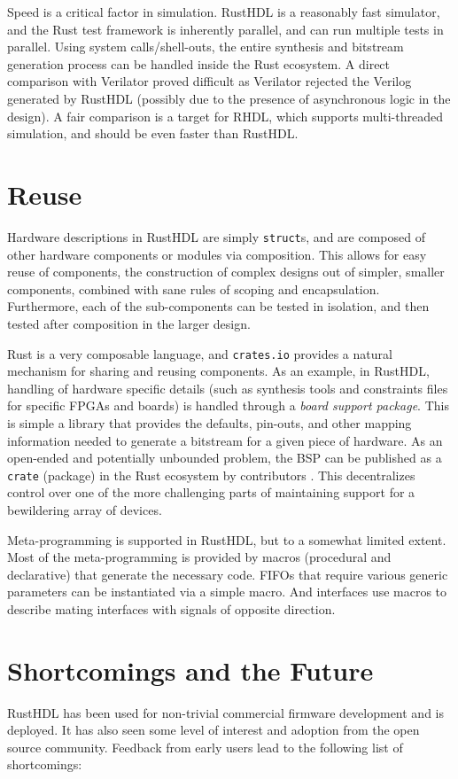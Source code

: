 \documentclass[sigplan,screen,sigconf]{acmart}
\begin{document}
Speed is a critical factor in simulation.  RustHDL is a reasonably fast simulator, 
and the Rust test framework is inherently parallel, and can run multiple tests in parallel. Using system calls/shell-outs, the entire synthesis and bitstream generation process can be handled inside the Rust ecosystem.  A direct comparison with Verilator proved difficult as Verilator rejected the Verilog generated by RustHDL (possibly due to the presence of asynchronous logic in the design).  A fair comparison is a target for RHDL, which supports multi-threaded simulation, and should be even faster than RustHDL.

\section{Reuse}
Hardware descriptions in RustHDL are simply \verb|struct|s, and are composed of other 
hardware components or modules via composition.  This allows for easy reuse of components, the
construction of complex designs out of simpler, smaller components, combined with sane rules of scoping and encapsulation.  Furthermore, each of the sub-components can be tested in isolation, and then tested after composition in the larger design. 

Rust is a very composable language, and \verb|crates.io| provides a natural mechanism
for sharing and reusing components.  As an example, in RustHDL, handling of hardware specific details (such as synthesis tools and constraints files for specific FPGAs and boards) is handled through a \emph{board support package}.  This is simple a library that provides the defaults, pin-outs, and other mapping information needed to generate a bitstream for a given piece of hardware.  As an open-ended and potentially unbounded problem, the BSP can be published as a \verb|crate| (package) in the Rust ecosystem by contributors \cite{b7}.  This decentralizes control over one of the more challenging parts of maintaining support for a bewildering array of devices. 

Meta-programming is supported in RustHDL, but to a somewhat limited extent.  Most of the meta-programming is provided by macros (procedural and declarative) that generate the necessary code.   FIFOs that require various generic parameters can be instantiated via a simple macro.  And interfaces use macros to describe mating interfaces with signals of opposite direction.  

\section{Shortcomings and the Future}
RustHDL has been used for non-trivial commercial firmware development and is deployed.  It has also seen some level of interest and adoption from the open source community.  Feedback from early users lead to the following list of shortcomings:
\end{document}
